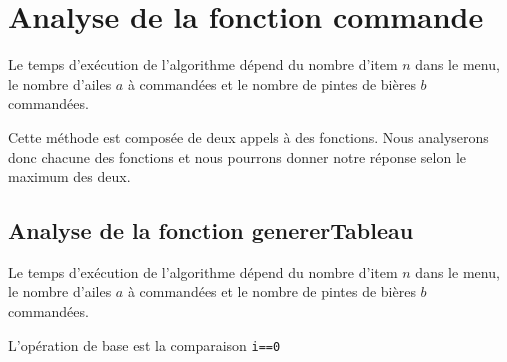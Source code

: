 \documentclass[class=article]{standalone}
\begin{document}
\section*{Analyse de la fonction commande}

Le temps d'exécution de l'algorithme dépend du nombre d'item $n$ dans le menu,
le nombre d'ailes $a$ à commandées et le nombre de pintes de bières $b$ commandées.

Cette méthode est composée de deux appels à des fonctions. Nous analyserons donc
chacune des fonctions et nous pourrons donner notre réponse selon le maximum des deux.

\subsection*{Analyse de la fonction genererTableau }

Le temps d'exécution de l'algorithme dépend du nombre d'item $n$ dans le menu,
le nombre d'ailes $a$ à commandées et le nombre de pintes de bières $b$ commandées.

L'opération de base est la comparaison \lstinline{i==0}
\end{document}
